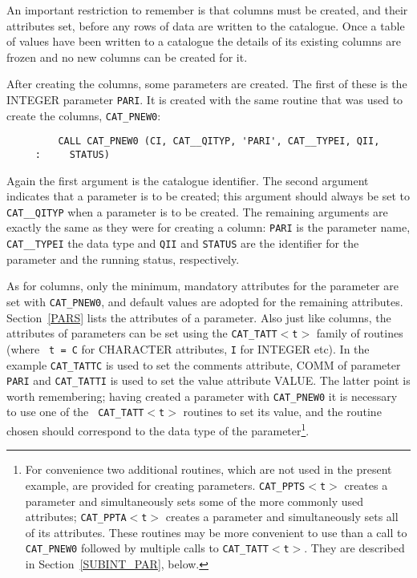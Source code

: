 An important restriction to remember is that columns must be created,
and their attributes set, before any rows of data are written to the
catalogue. Once a table of values have been written to a catalogue the
details of its existing columns are frozen and no new columns can be
created for it.

After creating the columns, some parameters are created. The first of
these is the INTEGER parameter {\tt PARI}. It is created with the same 
routine that was used to create the columns, {\tt CAT\_PNEW0}:

\begin{verbatim}
         CALL CAT_PNEW0 (CI, CAT__QITYP, 'PARI', CAT__TYPEI, QII,
     :     STATUS)
\end{verbatim}

Again the first argument is the catalogue identifier. The second 
argument indicates that a parameter is to be created; this argument
should always be set to {\tt CAT\_\_QITYP} when a parameter is to be
created. The remaining arguments are exactly the same as they were for
creating a column: {\tt PARI} is the parameter name, {\tt CAT\_\_TYPEI}
the data type and {\tt QII} and {\tt STATUS} are the identifier for the
parameter and the running status, respectively.

As for columns, only the minimum, mandatory attributes for the parameter
are set with {\tt CAT\_PNEW0}, and default values are adopted for the
remaining attributes. Section~\ref{PARS} lists the attributes of a
parameter. Also just like columns, the attributes of parameters can be 
set using the {\tt CAT\_TATT$<$t$>$} family of routines (where {\tt 
t = C} for CHARACTER attributes, {\tt I} for INTEGER etc). In the
example {\tt CAT\_TATTC} is used to set the comments attribute, COMM of 
parameter {\tt PARI} and {\tt CAT\_TATTI} is used to set the value 
attribute VALUE. The latter point is worth remembering; having created 
a parameter with {\tt CAT\_PNEW0} it is necessary to use one of the {\tt
CAT\_TATT$<$t$>$} routines to set its value, and the routine chosen 
should correspond to the data type of the parameter\footnote{For 
convenience two additional routines, which are not used in the present 
example, are provided for creating parameters. {\tt CAT\_PPTS$<$t$>$} 
creates a parameter and simultaneously sets some of the more commonly 
used attributes; {\tt CAT\_PPTA$<$t$>$} creates a parameter and 
simultaneously sets all of its attributes. These routines may be more 
convenient to use than a call to {\tt CAT\_PNEW0} followed by multiple 
calls to {\tt CAT\_TATT$<$t$>$}. They are described in 
Section~\ref{SUBINT_PAR}, below.}.

